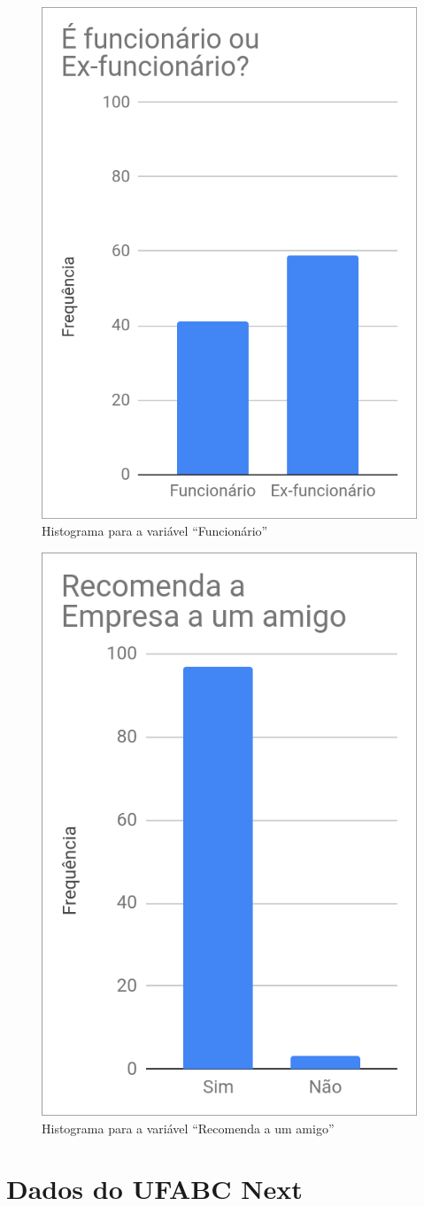 	\begin{figure}
		\centering
		\caption{Histograma para a variável ``Funcionário''}
		\label{fig:vinculo}
		\includegraphics[width=0.5\linewidth]{img/funcionario}
	\end{figure}

	\begin{figure}
		\centering
		\caption{Histograma para a variável ``Recomenda a um amigo''}
		\label{fig:recomendacao}
		\includegraphics[width=0.5\linewidth]{img/recomenda_amigo}
	\end{figure}

	\section{Dados do UFABC Next}
	
